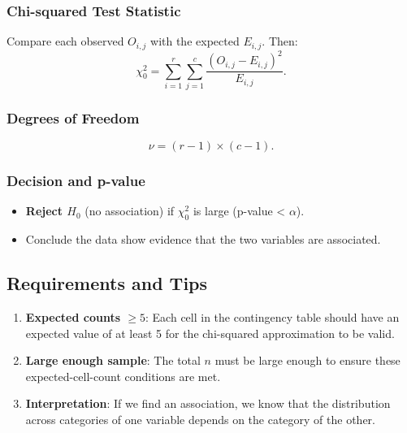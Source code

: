 \documentclass[10pt]{extarticle}
\begin{document}
\subsubsection{Chi-squared Test Statistic}

Compare each observed $O_{i,j}$ with the expected $E_{i,j}$. Then:
$$
    \chi^2_0
    = \sum_{i=1}^{r} \sum_{j=1}^{c} \frac{(O_{i,j} - E_{i,j})^2}{E_{i,j}}.
$$

\subsubsection{Degrees of Freedom}
$$
    \nu = (r - 1)\times(c - 1).
$$

\subsubsection{Decision and p-value}

\begin{itemize}
    \item \textbf{Reject $H_0$} (no association) if $\chi^2_0$ is large (p-value < $\alpha$).
    \item Conclude the data show evidence that the two variables are associated.
\end{itemize}

\subsection{Requirements and Tips}
\begin{enumerate}
    \item \textbf{Expected counts $\ge 5$}: Each cell in the contingency table should have an expected value of at least 5 for the chi-squared approximation to be valid.
    \item \textbf{Large enough sample}: The total $n$ must be large enough to ensure these expected-cell-count conditions are met.
    \item \textbf{Interpretation}: If we find an association, we know that the distribution across categories of one variable depends on the category of the other.
\end{enumerate}
\end{document}
